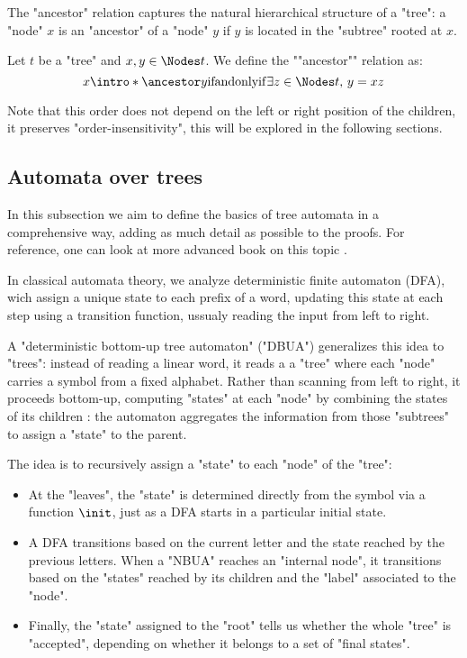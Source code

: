 \documentclass[a4paper,UKenglish,cleveref, autoref, thm-restate]{lipics-v2021}
\begin{document}
The "ancestor" relation captures the natural hierarchical structure of a "tree": a "node" $x$ is an "ancestor"
of a "node" $y$ if $y$ is located in the "subtree" rooted at $x$.

\begin{definition}
	\AP Let $t$ be a "tree" and $x, y \in \Nodes t $. We define the ""ancestor"" relation as:
	\[
		x \intro* \ancestor y \tiff \exists z \in \Nodes t ,\, y = xz
	\]
\end{definition}

\begin{remark}
	Note that this order does not depend on the left or right position of the children, \ie it preserves
	"order-insensitivity", this will be explored in the following sections.
\end{remark}


\subsection{Automata over trees}\label{sec:automata}

In this subsection we aim to define the basics of tree automata in a comprehensive way, adding as much detail as possible to the proofs. For reference,
one can look at more advanced book on this topic \cite{tata,Thomas1997,bookautomata}.

In classical automata theory, we analyze deterministic finite automaton (DFA), wich assign a unique state to each prefix of
a word, updating this state at each step using a transition function, ussualy reading the input from left to right.

A "deterministic bottom-up tree automaton" ("DBUA") generalizes this idea to "trees": instead of reading a linear word, it reads a
a "tree" where each "node" carries a symbol from a fixed alphabet. Rather than scanning from left to right, it proceeds
bottom-up, computing "states" at each "node" by combining the states of its children :
the automaton aggregates the information from those "subtrees" to assign a "state" to the parent.

The idea is to recursively assign a "state" to each "node" of the "tree":
\begin{itemize}
	\item At the "leaves", the "state" is determined directly from the symbol via a function $\init$, just as a DFA starts in a particular initial state.
	\item A DFA transitions based on the current letter and the state reached by the previous letters.
	      When a "NBUA" reaches an "internal node", it transitions based on the "states" reached by its children and the "label" associated to the "node".
	\item Finally, the "state" assigned to the "root" tells us whether the whole "tree" is "accepted",
	      depending on whether it belongs to a set of "final states".
\end{itemize}
\end{document}
